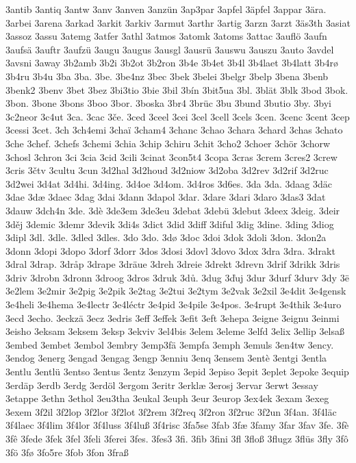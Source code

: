3antib
3antiq
3antw
3anv
3anven
3anzün
3ap3par
3apfel
3äpfel
3appar
3ära.
3arbei
3arena
3arkad
3arkit
3arkiv
3armut
3arthr
3artig
3arzn
3arzt
3äs3th
3asiat
3assoz
3assu
3atemg
3atfer
3athl
3atmos
3atomk
3atoms
3attac
3auflö
3aufn
3aufsä
3auftr
3aufzü
3augu
3augus
3ausgl
3ausrü
3auswu
3auszu
3auto
3avdel
3avsni
3away
3b2amb
3b2i
3b2ot
3b2ron
3b4e
3b4et
3b4l
3b4laet
3b4latt
3b4rø
3b4ru
3b4u
3ba
3ba.
3be.
3be4nz
3bec
3bek
3belei
3belgr
3belp
3bena
3benb
3benk2
3benv
3bet
3bez
3bi3tio
3bie
3bil
3bín
3bit5ua
3bl.
3blät
3blk
3bod
3bok.
3bon.
3bone
3bons
3boo
3bor.
3boska
3br4
3brüc
3bu
3bund
3butio
3by.
3byi
3c2neor
3c4ut
3ca.
3cac
3če.
3ced
3ceel
3cei
3cel
3cell
3cels
3cen.
3cenc
3cent
3cep
3cessi
3cet.
3ch
3ch4emi
3chaï
3cham4
3chanc
3chao
3chara
3chard
3chas
3chato
3che
3chef.
3chefs
3chemi
3chia
3chip
3chiru
3chit
3cho2
3choer
3chör
3chorw
3chosl
3chron
3ci
3cia
3cid
3cili
3cinat
3con5t4
3copa
3cras
3crem
3cres2
3crew
3cris
3čtv
3cultu
3cun
3d2hal
3d2houd
3d2niow
3d2oba
3d2rev
3d2rif
3d2ruc
3d2wei
3d4at
3d4hi.
3d4ing.
3d4oe
3d4om.
3d4ros
3d6es.
3da
3da.
3daag
3däc
3dae
3dæ
3daec
3dag
3dai
3dann
3dapol
3dar.
3dare
3dari
3daro
3das3
3dat
3dauw
3dch4n
3de.
3dè
3de3em
3de3eu
3debat
3debü
3debut
3deex
3deig.
3deir
3děj
3demic
3demr
3devik
3di4s
3dict
3did
3diff
3diful
3dig
3dine.
3ding
3diog
3dipl
3dl.
3dle.
3dled
3dles.
3do
3do.
3dø
3doc
3doi
3dok
3doli
3don.
3don2a
3donn
3dopi
3dopo
3dorf
3dorr
3dos
3dosi
3dovl
3dovo
3dox
3dra
3dra.
3drakt
3dral
3drap.
3dråp
3drape
3dräue
3dreh
3dreie
3drekt
3drevn
3drif
3drikk
3dris
3driv
3drobn
3dronn
3droog
3dros
3druk
3dů.
3dug
3ďuj
3dur
3durf
3durv
3dy
3ë
3e2lem
3e2mir
3e2pig
3e2pik
3e2tag
3e2tui
3e2tym
3e2vak
3e2xil
3e4dit
3e4gensk
3e4heli
3e4hema
3e4lectr
3e4léctr
3e4pid
3e4pile
3e4pos.
3e4rupt
3e4thik
3e4uro
3ecd
3echo.
3eckzä
3ecz
3edris
3eff
3effek
3efit
3eft
3ehepa
3eigne
3eignu
3einmi
3eisho
3eksam
3eksem
3eksp
3ekviv
3el4bis
3elem
3eleme
3elfd
3elix
3ellip
3elsaß
3embed
3embet
3embol
3embry
3emp3fä
3empfa
3emph
3emuls
3en4tw
3ency.
3endog
3energ
3engad
3engag
3engp
3enniu
3enq
3ensem
3entè
3entgi
3entla
3entlu
3entlü
3entso
3entus
3entz
3enzym
3epid
3episo
3epit
3eplet
3epoke
3equip
3erdäp
3erdb
3erdg
3erdöl
3ergom
3eritr
3erklæ
3erosj
3ervar
3erwt
3essay
3etappe
3ethn
3ethol
3eu3tha
3eukal
3euph
3eur
3europ
3ex4ek
3exam
3exeg
3exem
3f2il
3f2lop
3f2lor
3f2lot
3f2rem
3f2req
3f2ron
3f2ruc
3f2un
3f4an.
3f4läc
3f4laec
3f4lim
3f4lor
3f4luss
3f4luß
3f4risc
3fa5se
3fab
3fæ
3famy
3far
3fav
3fe.
3fè
3fê
3fede
3fek
3fel
3feli
3ferei
3fes.
3fes3
3fi.
3fib
3fini
3fl
3floß
3flugz
3flüs
3fly
3fô
3fö
3fø
3fo5re
3fob
3fon
3fraß
